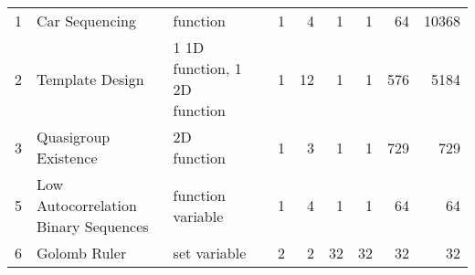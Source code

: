 \begin{sidewaystable}
\begin{center}
\begin{tabular}{r|l|l|l|r|r|r|r|r|r}
  1     &   Car Sequencing                                                  &   function                                                                                                  &   \cite{dincbas1988solving}                                            & 1                & 4                & 1                                                    & 1                                     & 64                                                          & 10368                                                       \\
  2     &   Template Design                                                 &   1 1D function, 1 2D function                                                                              &   \cite{proll1998integer}                                              & 1                & 12               & 1                                                    & 1                                     & 576                                                         & 5184                                                        \\
  3     &   Quasigroup Existence                                            &   2D function                                                                                               &   \cite{zhang1997specifying}                                           & 1                & 3                & 1                                                    & 1                                     & 729                                                         & 729                                                         \\
  5     &   Low Autocorrelation Binary Sequences                            &   function variable                                                                                         &   \cite{dotu2006note}                                                  & 1                & 4                & 1                                                    & 1                                     & 64                                                          & 64                                                          \\
  6     &   Golomb Ruler                                                    &   set variable                                                                                              &   \cite{smith99golomb}                                                 & 2                & 2                & 32                                                   & 32                                    & 32                                                          & 32                                                          \\

\end{tabular}
\end{center}
\end{sidewaystable}
